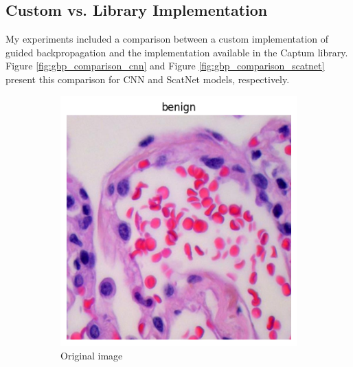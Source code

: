 \documentclass[10pt,twocolumn]{article}
\begin{document}
\subsection{Custom vs. Library Implementation}
My experiments included a comparison between a custom implementation of guided backpropagation and the implementation available in the Captum library. Figure \ref{fig:gbp_comparison_cnn} and Figure \ref{fig:gbp_comparison_scatnet} present this comparison for CNN and ScatNet models, respectively.

\begin{figure}[h]
\centering
\begin{subfigure}{0.32\columnwidth}
\includegraphics[width=\linewidth]{imgs/normal_image.png}
\caption{Original image}
\end{subfigure}
\hfill
\begin{subfigure}{0.32\columnwidth}

\end{subfigure}
\end{figure}
\end{document}
